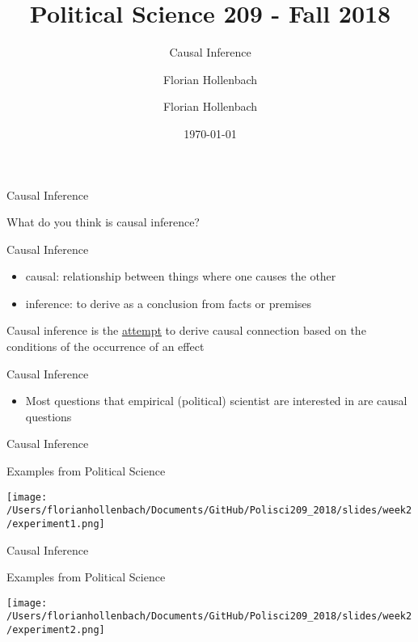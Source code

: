 \documentclass[presentation]{beamer}
\author{Florian Hollenbach}
\author{Florian Hollenbach}
\date{\today}
\title{Political Science 209 - Fall 2018}
\subtitle{Causal Inference}
\begin{document}
\maketitle


\begin{frame}[label={sec:org2391538}]{Causal Inference}
\begin{block}{What do you think is causal inference?}
\end{block}
\end{frame}

\begin{frame}[label={sec:orgec246e6}]{Causal Inference}
\begin{itemize}
\item causal: relationship between things where one causes the other
\item inference: to derive as a conclusion from facts or premises
\end{itemize}

Causal inference is the \uline{\uline{attempt}} to derive causal connection based on the conditions of the occurrence of an effect
\end{frame}

\begin{frame}[label={sec:org911941f}]{Causal Inference}
\begin{itemize}
\item Most questions that empirical (political) scientist are interested in are causal questions
\end{itemize}
\end{frame}

\begin{frame}[label={sec:orge8856a2}]{Causal Inference}
\begin{block}{Examples from Political Science}
\begin{center}
\texttt{[image: /Users/florianhollenbach/Documents/GitHub/Polisci209\_2018/slides/week2/experiment1.png]}
\end{center}
\end{block}
\end{frame}

\begin{frame}[label={sec:orgf0b6048}]{Causal Inference}
\begin{block}{Examples from Political Science}
\begin{center}
\texttt{[image: /Users/florianhollenbach/Documents/GitHub/Polisci209\_2018/slides/week2/experiment2.png]}
\end{center}
\end{block}
\end{frame}
\end{document}

